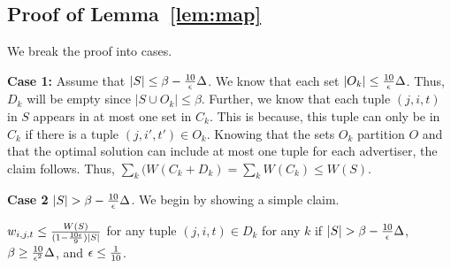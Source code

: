 \subsection{Proof of Lemma~\ref{lem:map}}
\label{sec:lem}
We break the proof into cases.

\medskip \noindent \textbf{Case 1:} Assume that $|S| \leq \beta - \frac{10}{\epsilon} \Delta$.   We know that each set $|O_k| \leq  \frac{10}{\epsilon} \Delta$.  Thus, $D_k$ will be empty since $|S \cup O_k| \leq \beta$.  Further, we know that each tuple $(j,i,t)$ in $S$ appears in at most one set in $C_k$.   This is because, this tuple can only be in $C_k$ if  there is a tuple $(j,i',t') \in O_k$.  Knowing that the sets $O_k$ partition $O$ and that the optimal solution can include at most one tuple for each advertiser, the claim follows. Thus, $\sum_{k}(W(C_k + D_k)= \sum_{k} W(C_k) \leq W(S)$.


\medskip \noindent \textbf{Case 2} $|S| > \beta - \frac{10}{\epsilon} \Delta$.  We begin by showing a simple claim.

\begin{claim}
\label{claim:smallcost}
$w_{i,j,t} \leq \frac{W(S)}{(1-\frac{10\epsilon}{9})|S|}$ for any tuple $(j,i,t) \in D_k$ for any $k$ if $|S| > \beta - \frac{10}{\epsilon} \Delta$,  $\beta \geq \frac{10}{\epsilon^2}\Delta$, and $\epsilon \leq \frac{1}{10}$.
\end{claim}


